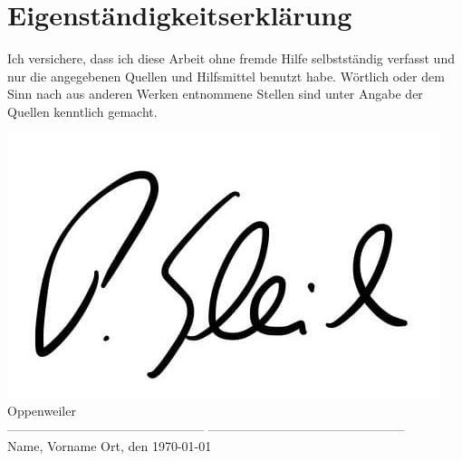 \section* {%
{Eigenständigkeitserklärung}}%
Ich versichere, dass ich diese Arbeit ohne fremde Hilfe selbstständig verfasst und nur die angegebenen Quellen und Hilfsmittel benutzt habe. Wörtlich oder dem Sinn nach aus anderen Werken entnommene Stellen sind unter Angabe der Quellen kenntlich gemacht.
\vspace{1cm}%


\begin{flushleft}%

\includegraphics[width=0.2 \textwidth]{Figures/Signing.jpg}
\hfill
Oppenweiler\\
-----------------------------------------------
\hfill%
-----------------------------------------------\\%
Name, Vorname%
\hfill%
Ort, den \today%
\end{flushleft}%
